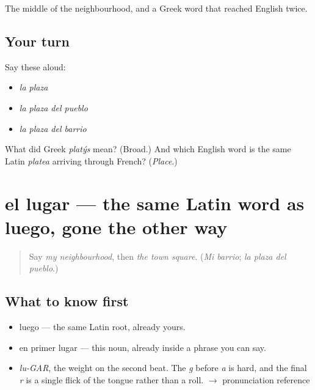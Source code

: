 \begin{grammarlens}[title={What you've built}]
The middle of the neighbourhood, and a Greek word that reached English twice.
\end{grammarlens}

\subsection*{Your turn}
Say these aloud:

\begin{itemize}
\raggedright
  \item \emph{la plaza}
  \item \emph{la plaza del pueblo}
  \item \emph{la plaza del barrio}
\end{itemize}

\begin{tcolorbox}[breakable,colback=teal!4,colframe=teal!35!black,title={Before you move on}]
What did Greek \emph{platýs} mean? (Broad.) And which English word is the same Latin \emph{platea} arriving through French? (\emph{Place}.)
\end{tcolorbox}
\section[el lugar]{el lugar — the same Latin word as luego, gone the other way}

\label{lesson:ES-C325-lugar}



\begin{quote}
Say \emph{my neighbourhood}, then \emph{the town square}. (\emph{Mi barrio}; \emph{la plaza del pueblo}.)
\end{quote}

\subsection*{What to know first}
\begin{itemize}
\raggedright
  \item luego — the same Latin root, already yours.
  \item en primer lugar — this noun, already inside a phrase you can say.
\end{itemize}

\begin{sounds}
\begin{itemize}
\raggedright
  \item \emph{lu-GAR}, the weight on the second beat. The \emph{g} before \emph{a} is hard, and the final \emph{r} is a single flick of the tongue rather than a roll. $\to$ pronunciation reference
\end{itemize}
\end{sounds}

